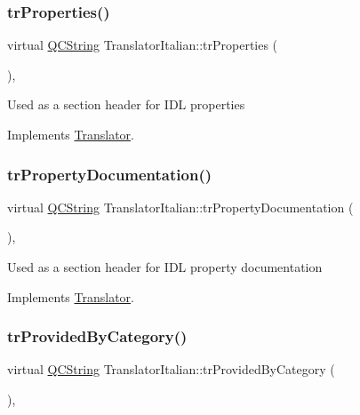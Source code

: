 \subsubsection{\texorpdfstring{trProperties()}{trProperties()}}
{\footnotesize\ttfamily virtual \mbox{\hyperlink{class_q_c_string}{Q\+C\+String}} Translator\+Italian\+::tr\+Properties (\begin{DoxyParamCaption}{ }\end{DoxyParamCaption})\hspace{0.3cm}{\ttfamily [inline]}, {\ttfamily [virtual]}}

Used as a section header for I\+DL properties 

Implements \mbox{\hyperlink{class_translator}{Translator}}.

\mbox{\label{class_translator_italian_af7c9d139eb6997eb44d83f0caafbdb87}} 
\subsubsection{\texorpdfstring{trPropertyDocumentation()}{trPropertyDocumentation()}}
{\footnotesize\ttfamily virtual \mbox{\hyperlink{class_q_c_string}{Q\+C\+String}} Translator\+Italian\+::tr\+Property\+Documentation (\begin{DoxyParamCaption}{ }\end{DoxyParamCaption})\hspace{0.3cm}{\ttfamily [inline]}, {\ttfamily [virtual]}}

Used as a section header for I\+DL property documentation 

Implements \mbox{\hyperlink{class_translator}{Translator}}.

\mbox{\label{class_translator_italian_a8fcbea3a9189356878ca2bdc947a5f08}} 
\subsubsection{\texorpdfstring{trProvidedByCategory()}{trProvidedByCategory()}}
{\footnotesize\ttfamily virtual \mbox{\hyperlink{class_q_c_string}{Q\+C\+String}} Translator\+Italian\+::tr\+Provided\+By\+Category (\begin{DoxyParamCaption}{ }\end{DoxyParamCaption})\hspace{0.3cm}{\ttfamily [inline]}, {\ttfamily [virtual]}}


